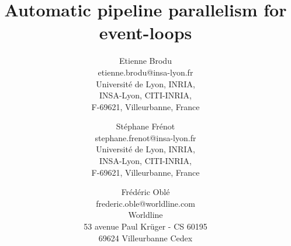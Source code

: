\documentclass[10pt]{article}
\begin{document}
\title{%
\textbf{Automatic pipeline parallelism for event-loops}
}

\author{
  Etienne Brodu\\
  \textsf{\normalsize{etienne.brodu@insa-lyon.fr}}\\
  \textsf{\small{Université de Lyon, INRIA,}}\\
  \textsf{\small{INSA-Lyon, CITI-INRIA,}}\\
  \textsf{\small{F-69621, Villeurbanne, France}}
  \and
  Stéphane Frénot\\
  \textsf{\normalsize{stephane.frenot@insa-lyon.fr}}\\
  \textsf{\small{Université de Lyon, INRIA,}}\\
  \textsf{\small{INSA-Lyon, CITI-INRIA,}}\\
  \textsf{\small{F-69621, Villeurbanne, France}}
  \and
  Frédéric Oblé\\
  \textsf{\normalsize{frederic.oble@worldline.com}}\\
  \textsf{\small{Worldline}}\\
  \textsf{\small{53 avenue Paul Krüger - CS 60195}}\\
  \textsf{\small{69624 Villeurbanne Cedex}}
}

\date{}


\maketitle

% 




\printbibliography[]
\end{document}
